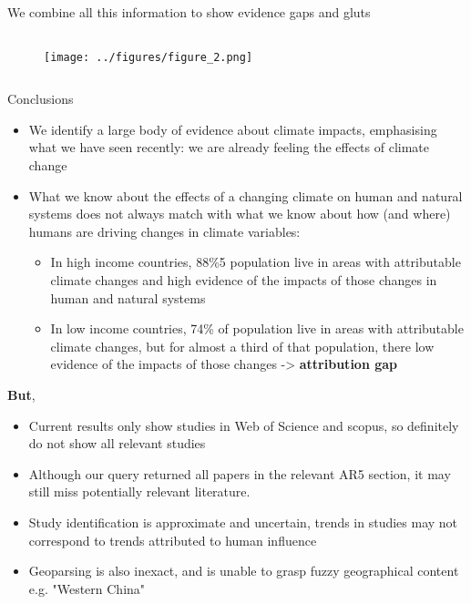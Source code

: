 \documentclass[9pt]{beamer}
\begin{document}
\begin{frame}{We combine all this information to show evidence gaps and gluts}

\begin{columns}
	\begin{column}{0.9\linewidth}
		\begin{figure}
			\texttt{[image: ../figures/figure\_2.png]}
		\end{figure}
	\end{column}
\end{columns}

\end{frame}

\begin{frame}{Conclusions}

\begin{itemize}
	\item We identify a large body of evidence about climate impacts, emphasising what we have seen recently: we are already feeling the effects of climate change
	\item What we know about the effects of a changing climate on human and natural systems does not always match with what we know about how (and where) humans are driving changes in climate variables:
	\begin{itemize}
		\item In high income countries, 88\%5 population live in areas with attributable climate changes and high evidence of the impacts of those changes in human and natural systems
		\item In low income countries, 74\% of population live in areas with attributable climate changes, but for almost a third of that population, there low evidence of the impacts of those changes -> \textbf{attribution gap}
	\end{itemize}
\end{itemize}

\textbf{But}, 

\begin{itemize}
	\item Current results only show studies in Web of Science and scopus, so definitely do not show all relevant studies
	\item Although our query returned all papers in the relevant AR5 section, it may still miss potentially relevant literature.
	\item Study identification is approximate and uncertain, trends in studies may not correspond to trends attributed to human influence
	\item Geoparsing is also inexact, and is unable to grasp fuzzy geographical content e.g. "Western China"
\end{itemize}

\end{frame}
\end{document}
